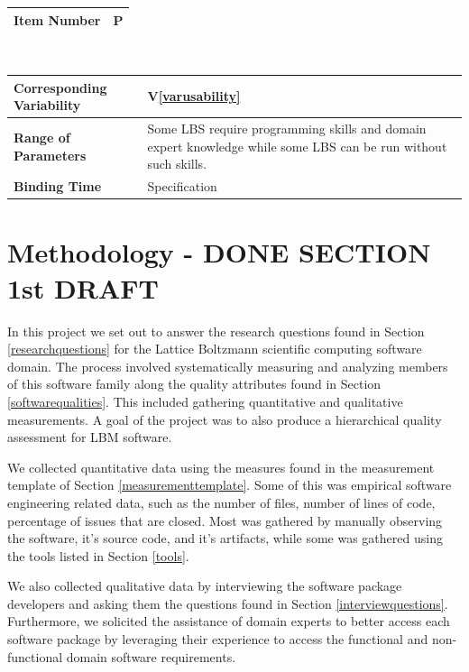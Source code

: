 \documentclass[12pt, notitlepage]{article}
\newcommand{\colEwidth}{0.33\textwidth}
\newcommand{\colFwidth}{0.67\textwidth}
\newcommand{\vref}[1]{V\ref{#1}}
\newcounter{parnum} %
\begin{document}
\begin{minipage}{\textwidth}
	\renewcommand*{\arraystretch}{1.5}
	\begin{tabular}{| p{\colEwidth} | p{\colFwidth}|}
		\hline
		\bf Item Number& P{parnum}\theparnum\label{parusability} \\
		\hline
	\end{tabular}\\
	
	\begin{tabular}{| p{\colEwidth} | p{\colFwidth}|}		
		\hline
		\bf Corresponding Variability & \vref{varusability}\\
		\hline
		\bf Range of Parameters & Some LBS require programming skills and domain expert knowledge while some LBS can be run without such skills.\\
		\hline
		\bf Binding Time & Specification\\
		\hline
	\end{tabular}
\end{minipage}

\newpage
\section{Methodology - DONE SECTION 1st DRAFT}

In this project we set out to answer the research questions found in Section \ref{researchquestions} for the Lattice Boltzmann scientific computing software domain. The process involved systematically measuring and analyzing members of this software family along the quality attributes found in Section \ref{softwarequalities}. This included gathering quantitative and qualitative measurements. A goal of the project was to also produce a hierarchical quality assessment for LBM software.  

We collected quantitative data using the measures found in the measurement template of Section \ref{measurementtemplate}. Some of this was empirical software engineering related data, such as the number of files, number of lines of code, percentage of issues that are closed. Most was gathered by manually observing the software, it's source code, and it's artifacts, while some was gathered using the tools listed in Section \ref{tools}.

We also collected qualitative data by interviewing the software package developers and asking them the questions found in Section \ref{interviewquestions}. Furthermore, we solicited the assistance of domain experts to better access each software package by leveraging their experience to access the functional and non-functional domain software requirements. 
\end{document}
